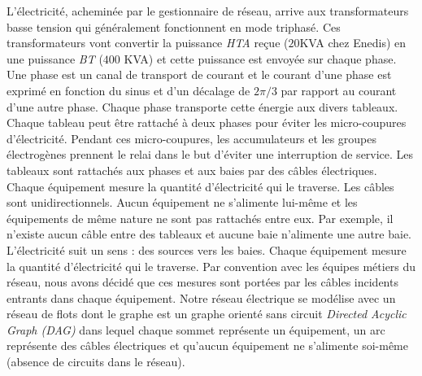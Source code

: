 L'\'electricit\'e, achemin\'ee par le gestionnaire de r\'eseau, arrive aux transformateurs basse tension qui g\'en\'eralement fonctionnent en mode triphas\'e.
Ces transformateurs vont convertir la puissance {\em HTA} re\c cue ($ 20 $KVA chez Enedis) en une puissance {\em BT} ($ 400 $ KVA) et cette puissance est envoy\'ee sur chaque phase.
Une phase est un canal de transport de courant et 
le courant d'une phase est exprim\'e en fonction du sinus et d'un d\'ecalage de $ 2\pi/3 $ par rapport au courant d'une autre phase.
Chaque phase transporte cette \'energie aux divers tableaux. 
Chaque tableau peut \^etre rattach\'e \`a deux phases pour \'eviter les micro-coupures d'\'electricit\'e. Pendant ces micro-coupures, les accumulateurs et les groupes \'electrog\`enes prennent le relai dans le but d'\'eviter une interruption de service.
Les tableaux sont rattach\'es aux phases et aux baies par des c\^ables \'electriques. 
Chaque \'equipement mesure la quantit\'e d'\'electricit\'e qui le traverse.
Les c\^ables sont unidirectionnels. 
Aucun \'equipement ne s'alimente lui-m\^eme et les \'equipements de m\^eme nature ne sont pas rattach\'es entre eux. Par exemple, il n'existe aucun c\^able entre des tableaux et aucune baie n'alimente une autre baie.
L'\'electricit\'e suit un sens : des sources vers les baies. 
Chaque \'equipement mesure la quantit\'e d'\'electricit\'e qui le traverse. 
 Par convention avec les \'equipes m\'etiers du r\'eseau, nous avons d\'ecid\'e que ces mesures sont port\'ees par les c\^ables incidents entrants dans chaque \'equipement.
\newline
Notre r\'eseau \'electrique se  mod\'elise avec un r\'eseau de flots dont le graphe est un graphe orient\'e sans circuit {\em Directed Acyclic Graph (DAG)} dans lequel
chaque sommet repr\'esente un \'equipement,
un arc repr\'esente des c\^ables \'electriques et 
 qu'aucun \'equipement ne s'alimente soi-m\^eme (absence de circuits dans le r\'eseau). 